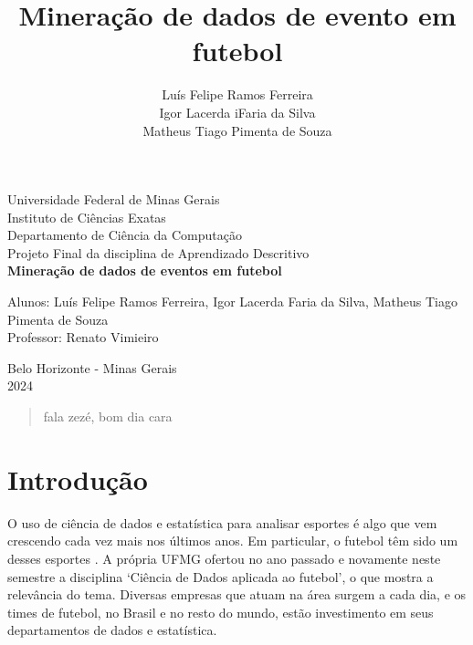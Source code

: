 \documentclass{article}
\begin{document}
\begin{titlepage}
	\begin{center}
		{\large Universidade Federal de Minas Gerais}\\[0.2cm]
		{\large Instituto de Ciências Exatas}\\[0.2cm]
		{\large Departamento de Ciência da Computação}\\[0.2cm]
		{\large Projeto Final da disciplina de Aprendizado Descritivo}\\[5.1cm]
		{\large \bf Mineração de dados de eventos em futebol}\\[5.1cm]
	\end{center}
	{\large Alunos: Luís Felipe Ramos Ferreira, Igor Lacerda Faria da Silva,
	Matheus Tiago Pimenta de Souza}\\[0.7cm]
	{\large Professor: Renato Vimieiro}\\[5.1cm]
	\begin{center}
		{\large Belo Horizonte - Minas Gerais}\\[0.2cm]
		{\large 2024}
	\end{center}
\end{titlepage}

\newpage
\begin{quote}
	fala zezé, bom dia cara
\end{quote}

\newpage
\renewcommand{\contentsname}{Sumário}
\tableofcontents
\newpage

\title{Mineração de dados de evento em futebol}
\author{Luís Felipe Ramos Ferreira \\  Igor Lacerda iFaria da Silva \\ Matheus
	Tiago Pimenta de Souza}

\maketitle

\section{Introdução}

O uso de ciência de dados e estatística para analisar esportes é algo que vem
crescendo cada vez mais nos últimos anos. Em
particular, o futebol têm sido um desses
esportes \cite{takvorian2021beautiful}. A própria UFMG ofertou no
ano passado e novamente neste semestre a disciplina `Ciência de Dados aplicada
ao futebol', o que mostra a relevância do tema. Diversas empresas que atuam na
área surgem a cada dia, e os times de futebol, no Brasil e no resto do
mundo, estão investimento em seus departamentos de dados e estatística.
\end{document}
